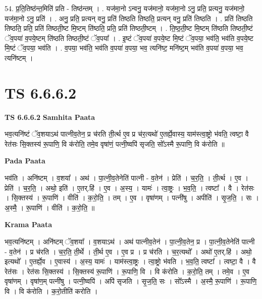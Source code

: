 \documentclass[17pt]{extarticle}
\begin{document}
54. प्र॒ति॒तिष्ठ॑न्त॒मिति॑ प्रति - तिष्ठ॑न्तम् । . यज॑मा॒नो ऽन्वनु॒ यज॑मानो॒ यज॑मा॒नो ऽनु॒ प्रति॒ प्रत्यनु॒ यज॑मानो॒ यज॑मा॒नो ऽनु॒ प्रति॑ । . अनु॒ प्रति॒ प्रत्यन् वनु॒ प्रति॑ तिष्ठति तिष्ठति॒ प्रत्यन् वनु॒ प्रति॑ तिष्ठति । . प्रति॑ तिष्ठति तिष्ठति॒ प्रति॒ प्रति॑ तिष्ठती॒ष्ट मि॒ष्टम् ति॑ष्ठति॒ प्रति॒ प्रति॑ तिष्ठती॒ष्टम् । . ति॒ष्ठ॒ती॒ष्ट मि॒ष्टम् ति॑ष्ठति तिष्ठती॒ष्टं ॅव॒पया॑ व॒पये॒ष्टम् ति॑ष्ठति तिष्ठती॒ष्टं ॅव॒पया᳚ । . इ॒ष्टं ॅव॒पया॑ व॒पये॒ष्ट मि॒ष्टं ॅव॒पया॒ भव॑ति॒ भव॑ति व॒पये॒ष्ट मि॒ष्टं ॅव॒पया॒ भव॑ति । . व॒पया॒ भव॑ति॒ भव॑ति व॒पया॑ व॒पया॒ भव॒ त्यनि॑ष्ट॒ मनि॑ष्ट॒म् भव॑ति व॒पया॑ व॒पया॒ भव॒ त्यनि॑ष्टम् । \newline
\pagebreak
{}

\section{ TS 6.6.6.2 }

\textbf{TS 6.6.6.2 } \newline
\textbf{Samhita Paata} \newline

भव॒त्यनि॑ष्टं ॅव॒शयाऽथ॑ पात्नीव॒तेन॒ प्र च॑रति ती॒र्त्थ ए॒व प्र च॑र॒त्यथो॑ ए॒तर्ह्ये॒वास्य॒ याम॑स्त्वा॒ष्ट्रो भ॑वति॒ त्वष्टा॒ वै रेत॑सः सि॒क्तस्य॑ रू॒पाणि॒ वि क॑रोति॒ तमे॒व वृषा॑णं॒ पत्नी॒ष्वपि॑ सृजति॒ सो᳚ऽस्मै रू॒पाणि॒ वि क॑रोति ॥ \newline

\textbf{Pada Paata} \newline

भव॑ति । अनि॑ष्टम् । व॒शया᳚ । अथ॑ । पा॒त्नी॒व॒तेनेति॑ पात्नी - व॒तेन॑ । प्रेति॑ । च॒र॒ति॒ । ती॒र्त्थ । ए॒व । प्रेति॑ । च॒र॒ति॒ । अथो॒ इति॑ । ए॒तर्.हि॑ । ए॒व । अ॒स्य॒ । यामः॑ । त्वा॒ष्ट्रः । भ॒व॒ति॒ । त्वष्टा᳚ । वै । रेत॑सः । सि॒क्तस्य॑ । रू॒पाणि॑ । वीति॑ । क॒रो॒ति॒ । तम् । ए॒व । वृषा॑णम् । पत्नी॑षु । अपीति॑ । सृ॒ज॒ति॒ । सः । अ॒स्मै॒ । रू॒पाणि॑ । वीति॑ । क॒रो॒ति॒ ॥  \newline


\textbf{Krama Paata} \newline

भव॒त्यनि॑ष्टम् । अनि॑ष्टम् ॅव॒शया᳚ । व॒शयाऽथ॑ । अथ॑ पात्नीव॒तेन॑ । पा॒त्नी॒व॒तेन॒ प्र । पा॒त्नी॒व॒तेनेति॑ पात्नी - व॒तेन॑ । प्र च॑रति । च॒र॒ति॒ ती॒र्थे । ती॒र्थ ए॒व । ए॒व प्र । प्र च॑रति । च॒र॒त्यथो᳚ । अथो॑ ए॒तर्.हि॑ । अथो॒ इत्यथो᳚ । ए॒तर्ह्ये॒व । ए॒वास्य॑ । अ॒स्य॒ यामः॑ । याम॑स्त्वा॒ष्ट्रः । त्वा॒ष्ट्रो भ॑वति । भ॒व॒ति॒ त्वष्टा᳚ । त्वष्टा॒ वै । वै रेत॑सः । रेत॑सः सि॒क्तस्य॑ । सि॒क्तस्य॑ रू॒पाणि॑ । रू॒पाणि॒ वि । वि क॑रोति । क॒रो॒ति॒ तम् । तमे॒व । ए॒व वृषा॑णम् । वृषा॑ण॒म् पत्नी॑षु । पत्नी॒ष्वपि॑ । अपि॑ सृजति । सृ॒ज॒ति॒ सः । सो᳚ऽस्मै । अ॒स्मै॒ रू॒पाणि॑ । रू॒पाणि॒ वि । वि क॑रोति । क॒रो॒तीति॑ करोति । \newline
\end{document}
